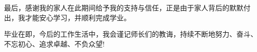 \documentclass[nomlist,masters,openany]{seuthesix}
\begin{document}
最后，感谢我的家人在此期间给予我的支持与信任，正是由于家人背后的默默付出，我才能安心学习，并顺利完成学业。

毕业在即，今后的工作生活中，我会谨记师长们的教诲，持续不断地努力、奋斗、不忘初心、追求卓越、不负众望!

\quad

\quad




\appendix

\end{document}
